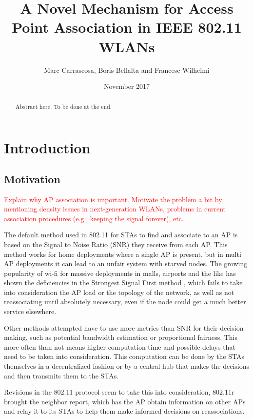 \documentclass{article}
\title{A Novel Mechanism for Access Point Association in IEEE 802.11 WLANs}
\author{Marc Carrascosa, Boris Bellalta and Francesc Wilhelmi}
\date{November 2017}
\begin{document}
\maketitle

\begin{abstract}
	Abstract here. To be done at the end.
\end{abstract}

\tableofcontents
\newpage

\section{Introduction}
\label{section:introduction}
	
	\subsection{Motivation}
	\label{section:motivation}
		\textcolor{red}{Explain why AP association is important. Motivate the problem a bit by mentioning density issues in next-generation WLANs, problems in current association procedures (e.g., keeping the signal forever), etc.}

	The default method used in 802.11 for STAs to find and associate to an AP is based on the Signal to Noise Ratio (SNR) they receive from each AP. This method works for home deployments where a single AP is present, but in multi AP deployments it can lead to an unfair system with starved nodes. The growing popularity of wi-fi for massive deployments in malls, airports and the like has shown the deficiencies in the Strongest Signal First method \cite{judd2004}\cite{anand2002}, which fails to take into consideration the AP load or the topology of the network, as well as not reassociating until absolutely necessary, even if the node could get a much better service elsewhere.
	
	Other methods attempted have to use more metrics than SNR for their decision making, such as potential bandwidth estimation \cite{vasudevan2005} or proportional fairness\cite{Li2014}. This more often than not means higher computation time and possible delays that need to be taken into consideration. This computation can be done by the STAs themselves in a decentralized fashion or by a central hub that makes the decisions and then transmits them to the STAs. 
	
	
	Revisions in the 802.11 protocol seem to take this into consideration, 802.11r brought the neighbor report, which has the AP obtain information on other APs and relay it to its STAs to help them make informed decisions on reassociations. 
	
\end{document}
